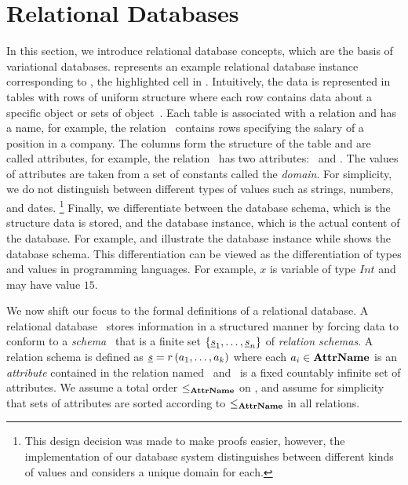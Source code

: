 \section{Relational Databases}
\label{sec:rdb}

In this section, we introduce relational database concepts, which are the basis of variational databases. 
 represents an example relational
database instance corresponding to \vTwo, the highlighted cell in . 
%
Intuitively, the data is represented in tables with rows of uniform structure
where each row contains  data about a specific
object or sets of object~\cite{AliceBook}. Each table is 
associated with a relation and has a name, for example, 
the relation \job\ contains rows specifying the salary of a position in a company. 
The columns form the structure of the table and are called attributes,
for example, the relation \job\ has two attributes: \titleatt\ and \salary. 
The values of attributes are taken from a set of constants called the \emph{domain}. 
For simplicity, 
we do not distinguish between different types of values such as strings, numbers, and
dates.%
\footnote{This design decision was made to make proofs easier, however, the implementation of our
database system  distinguishes between different kinds of values
and considers a unique domain for each.}
%
Finally, we differentiate between the database schema, which is the structure 
data is stored, and the database instance, which is the actual content of the 
database. 
%
For example,  and  illustrate the database 
instance while  shows the database schema. 
%
This differentiation can be viewed as the differentiation of types and
values in programming languages. For example, $x$ is variable of type $\mathit{Int}$
and may have value $15$. 






We now shift our focus to the formal definitions of a relational database. 
A relational database \pDB\ stores information in a structured manner by forcing
data to conform to a \emph{schema} \pSch\ that is a finite set 
$\setDef {{\pRelSch}_1, \ldots, {\pRelSch}_n}$ of \emph{relation schemas}.
A relation schema is defined as
$\pRelSch = \vRel \paran {\vi \pAtt k}$ where each $\pAtt_i \in \pAttSet$ is an
\emph{attribute} contained in the relation named \vRel\ and \pAttSet\ is a 
fixed countably infinite set of 
attributes. %
%
We assume a total order $\leq_{\pAttSet}$ on \pAttSet, and assume for
simplicity that sets of attributes are sorted according
to $\leq_{\pAttSet}$ in all relations.
%

